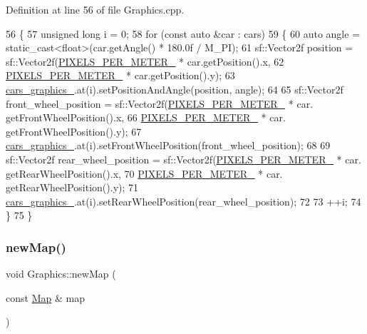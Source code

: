 Definition at line 56 of file Graphics.\+cpp.


\begin{DoxyCode}
56                                                           \{
57     \textcolor{keywordtype}{unsigned} \textcolor{keywordtype}{long} i = 0;
58     \textcolor{keywordflow}{for} (\textcolor{keyword}{const} \textcolor{keyword}{auto} &car : cars)
59     \{
60         \textcolor{keyword}{auto} angle = \textcolor{keyword}{static\_cast<}\textcolor{keywordtype}{float}\textcolor{keyword}{>}(car.getAngle() * 180.0f / M\_PI);
61         sf::Vector2f position = sf::Vector2f(\hyperlink{classGraphics_af9c6251065c2900d0a92380c2bea26b2}{PIXELS\_PER\_METER\_} * car.getPosition().x,
62                                              \hyperlink{classGraphics_af9c6251065c2900d0a92380c2bea26b2}{PIXELS\_PER\_METER\_} * car.getPosition().y);
63         \hyperlink{classGraphics_a8be356ffe3ee47f915027361b6ae34ab}{cars\_graphics\_}.at(i).setPositionAndAngle(position, angle);
64 
65         sf::Vector2f front\_wheel\_position = sf::Vector2f(\hyperlink{classGraphics_af9c6251065c2900d0a92380c2bea26b2}{PIXELS\_PER\_METER\_} * car.
      getFrontWheelPosition().x,
66                                                          \hyperlink{classGraphics_af9c6251065c2900d0a92380c2bea26b2}{PIXELS\_PER\_METER\_} * car.
      getFrontWheelPosition().y);
67         \hyperlink{classGraphics_a8be356ffe3ee47f915027361b6ae34ab}{cars\_graphics\_}.at(i).setFrontWheelPosition(front\_wheel\_position);
68 
69         sf::Vector2f rear\_wheel\_position = sf::Vector2f(\hyperlink{classGraphics_af9c6251065c2900d0a92380c2bea26b2}{PIXELS\_PER\_METER\_} * car.
      getRearWheelPosition().x,
70                                                         \hyperlink{classGraphics_af9c6251065c2900d0a92380c2bea26b2}{PIXELS\_PER\_METER\_} * car.
      getRearWheelPosition().y);
71         \hyperlink{classGraphics_a8be356ffe3ee47f915027361b6ae34ab}{cars\_graphics\_}.at(i).setRearWheelPosition(rear\_wheel\_position);
72 
73         ++i;
74     \}
75 \}
\end{DoxyCode}
\mbox{\label{classGraphics_adf0937a71f5d477bcd9c553fe863e87b}} 
\subsubsection{\texorpdfstring{new\+Map()}{newMap()}}
{\footnotesize\ttfamily void Graphics\+::new\+Map (\begin{DoxyParamCaption}\item[{const \hyperlink{classMap}{Map} \&}]{map }\end{DoxyParamCaption})}



